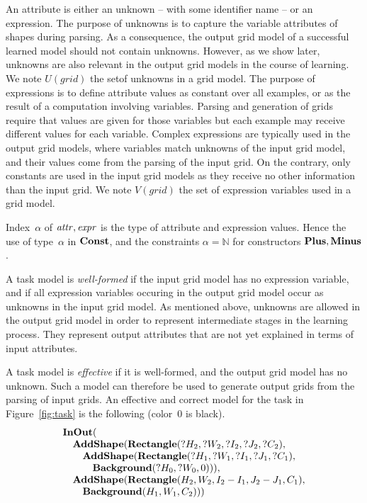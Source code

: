 \documentclass[a4paper]{llncs}
\newcommand{\nat}{\mathbb{N}}
\begin{document}
An attribute is either an unknown -- with some identifier name -- or
an expression. The purpose of unknowns is to capture the variable
attributes of shapes during parsing. As a consequence, the output grid
model of a successful learned model should not contain
unknowns. However, as we show later, unknowns are also relevant in the
output grid models in the course of learning. We note $U(grid)$ the
setof unknowns in a grid model.
%
The purpose of expressions is to define attribute values as constant
over all examples, or as the result of a computation involving
variables. Parsing and generation of grids require that values are
given for those variables but each example may receive different
values for each variable. Complex expressions are typically used in
the output grid models, where variables match unknowns of the input
grid model, and their values come from the parsing of the input
grid. On the contrary, only constants are used in the input grid
models as they receive no other information than the input grid.  We
note $V(grid)$ the set of expression variables used in a grid model.

Index~$\alpha$ of ${\it attr}, {\it expr}$ is the type of attribute
and expression values. Hence the use of type~$\alpha$ in
${\bf Const}$, and the constraints $\alpha = \nat$ for constructors
${\bf Plus}, {\bf Minus}$.

A task model is {\em well-formed} if the input grid model has no
expression variable, and if all expression variables occuring in the
output grid model occur as unknowns in the input grid model. As
mentioned above, unknowns are allowed in the output grid model in
order to represent intermediate stages in the learning process. They
represent output attributes that are not yet explained in terms of
input attributes.

A task model is {\em effective} if it is well-formed, and the output
grid model has no unknown. Such a model can therefore be used to
generate output grids from the parsing of input grids. An effective
and correct model for the task in Figure~\ref{fig:task} is the
following (color~0 is black).
\[\begin{array}{l}
{\bf InOut}( \\
\quad {\bf AddShape}({\bf Rectangle}(?H_2,?W_2,?I_2,?J_2,?C_2), \\
\quad \quad {\bf AddShape}({\bf Rectangle}(?H_1,?W_1,?I_1,?J_1,?C_1), \\
\quad \quad \quad {\bf Background}(?H_0,?W_0,0))), \\
\quad {\bf AddShape}({\bf Rectangle}(H_2,W_2,I_2-I_1,J_2-J_1,C_1), \\
\quad \quad  {\bf Background}(H_1,W_1,C_2))) \\
\end{array}\]
\end{document}
